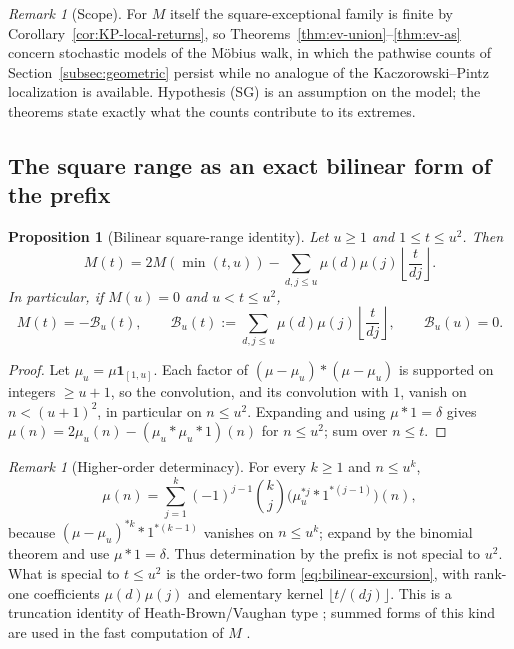 \documentclass[11pt]{amsart}
\numberwithin{equation}{section}
\theoremstyle{plain}
\newtheorem{proposition}[theorem]{Proposition}
\theoremstyle{definition}
\theoremstyle{remark}
\newtheorem{remark}[theorem]{Remark}
\begin{document}
\begin{remark}[Scope]
\label{rem:ev-scope}
For $M$ itself the square-exceptional family is finite by
Corollary~\ref{cor:KP-local-returns}, so
Theorems~\ref{thm:ev-union}--\ref{thm:ev-as} concern stochastic models of
the M\"obius walk, in which the pathwise counts of
Section~\ref{subsec:geometric} persist while no analogue of the
Kaczorowski--Pintz localization is available. Hypothesis (SG) is an
assumption on the model; the theorems state exactly what the counts
contribute to its extremes.
\end{remark}

\subsection{The square range as an exact bilinear form of the prefix}

\begin{proposition}[Bilinear square-range identity]
\label{prop:prefix-bilinear}
Let $u\ge1$ and $1\le t\le u^2$. Then
\begin{equation}
\label{eq:bilinear-general}
M(t)=2M(\min(t,u))-
\sum_{d,j\le u}\mu(d)\mu(j)\left\lfloor\frac{t}{dj}\right\rfloor.
\end{equation}
In particular, if $M(u)=0$ and $u<t\le u^2$,
\begin{equation}
\label{eq:bilinear-excursion}
M(t)=-\mathcal B_u(t),\qquad
\mathcal B_u(t):=\sum_{d,j\le u}\mu(d)\mu(j)
\left\lfloor\frac{t}{dj}\right\rfloor,
\qquad \mathcal B_u(u)=0.
\end{equation}
\end{proposition}

\begin{proof}
Let $\mu_u=\mu\mathbf1_{[1,u]}$. Each factor of $(\mu-\mu_u)*(\mu-\mu_u)$ is
supported on integers $\ge u+1$, so the convolution, and its convolution
with $1$, vanish on $n<(u+1)^2$, in particular on $n\le u^2$. Expanding and using $\mu*1=\delta$ gives
$\mu(n)=2\mu_u(n)-(\mu_u*\mu_u*1)(n)$ for $n\le u^2$; sum over $n\le t$.
\end{proof}

\begin{remark}[Higher-order determinacy]
\label{rem:prefix-k}
For every $k\ge1$ and $n\le u^k$,
\begin{equation}
\label{eq:HB-k}
\mu(n)=\sum_{j=1}^{k}(-1)^{j-1}\binom{k}{j}
\bigl(\mu_u^{*j}*1^{*(j-1)}\bigr)(n),
\end{equation}
because $(\mu-\mu_u)^{*k}*1^{*(k-1)}$ vanishes on $n\le u^k$; expand by the
binomial theorem and use $\mu*1=\delta$. Thus determination by the prefix
is not special to $u^2$. What is special to $t\le u^2$ is the order-two form
\eqref{eq:bilinear-excursion}, with rank-one coefficients $\mu(d)\mu(j)$ and
elementary kernel $\lfloor t/(dj)\rfloor$. This is a truncation identity of
Heath-Brown/Vaughan type \cite{HB82}; summed forms of this kind are used in
the fast computation of $M$ \cite{HT23}.
\end{remark}
\end{document}
